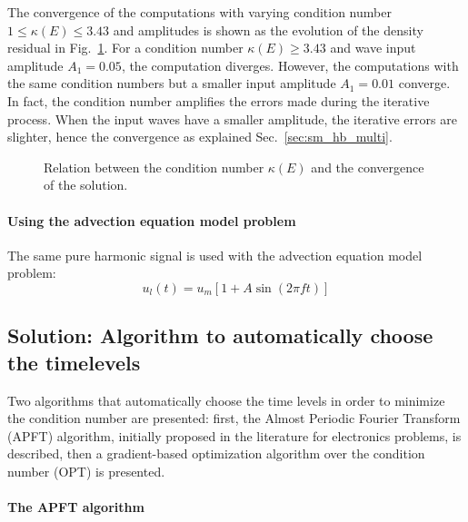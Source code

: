 The convergence of the computations with varying condition number 
$1 \leq \kappa (E) \leq 3.43$ and
amplitudes is shown as the evolution of the density residual in 
Fig.~\ref{fig:canal_residual_vs_conditionning}.
For a condition number $\kappa (E) \geq 3.43$ and wave input amplitude
$A_1 = 0.05$, the computation diverges. However, the computations with
the same condition numbers but a smaller input amplitude $A_1 = 0.01$
converge. In fact, the condition number amplifies the errors made
during the iterative process. When the input waves have a smaller
amplitude, the iterative errors are slighter, hence the convergence as
explained Sec.~\ref{sec:sm_hb_multi}.
\begin{figure}[htb]
  \centering 
  \caption{Relation between the condition number $\kappa (E)$ and the
    convergence of the solution.}
  \label{fig:canal_residual_vs_conditionning}
\end{figure}

\paragraph{Using the advection equation model problem}
The same pure harmonic signal is used with the advection equation
model problem:
\begin{equation}
   u_l (t) = u_m \left[ 1 + A \sin \left(2 \pi f t\right) \right]
\end{equation}


\subsection{Solution: Algorithm to automatically choose the timelevels} %
\label{sec:algorithm_to_automatically_choose_the_timelevels}

Two algorithms that automatically choose the time levels in order to
minimize the condition number are presented: first, the Almost
Periodic Fourier Transform (APFT) algorithm, initially proposed in the
 literature for electronics problems, is described, then a gradient-based
optimization algorithm over the condition number (OPT) is presented.

\paragraph{The APFT algorithm}
\label{sec:apft_algorithm}

